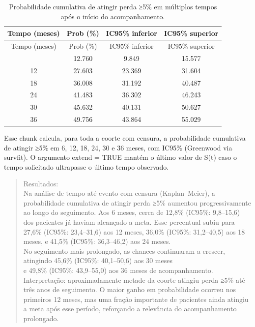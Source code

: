 \documentclass[
]{article}
\begin{document}
\begin{longtable}[]{@{}cccc@{}}
\caption{Probabilidade cumulativa de atingir perda ≥5\% em múltiplos
tempos após o início do acompanhamento.}\tabularnewline
\toprule\noalign{}
Tempo (meses) & Prob (\%) & IC95\% inferior & IC95\% superior \\
\midrule\noalign{}
\endfirsthead
\toprule\noalign{}
Tempo (meses) & Prob (\%) & IC95\% inferior & IC95\% superior \\
\midrule\noalign{}
\endhead
\bottomrule\noalign{}
\endlastfoot
6 & 12.760 & 9.849 & 15.577 \\
12 & 27.603 & 23.369 & 31.604 \\
18 & 36.008 & 31.192 & 40.487 \\
24 & 41.483 & 36.302 & 46.243 \\
30 & 45.632 & 40.131 & 50.627 \\
36 & 49.756 & 43.864 & 55.029 \\
\end{longtable}

Esse chunk calcula, para toda a coorte com censura, a probabilidade
cumulativa de atingir ≥5\% em 6, 12, 18, 24, 30 e 36 meses, com IC95\%
(Greenwood via survfit). O argumento extend = TRUE mantém o último valor
de S(t) caso o tempo solicitado ultrapasse o último tempo observado.

\begin{quote}
Resultados:\\
Na análise de tempo até evento com censura (Kaplan--Meier), a
probabilidade cumulativa de atingir perda ≥5\% aumentou progressivamente
ao longo do seguimento. Aos 6 meses, cerca de 12,8\% (IC95\%: 9,8--15,6)
dos pacientes já haviam alcançado a meta. Esse percentual subiu para
27,6\% (IC95\%: 23,4--31,6) aos 12 meses, 36,0\% (IC95\%: 31,2--40,5)
aos 18 meses, e 41,5\% (IC95\%: 36,3--46,2) aos 24 meses.\\
No seguimento mais prolongado, as chances continuaram a crescer,
atingindo 45,6\% (IC95\%: 40,1--50,6) aos 30 meses\\
e 49,8\% (IC95\%: 43,9--55,0) aos 36 meses de acompanhamento.\\
Interpretação: aproximadamente metade da coorte atingiu perda ≥5\% até
três anos de seguimento. O maior ganho em probabilidade ocorreu nos
primeiros 12 meses, mas uma fração importante de pacientes ainda atingiu
a meta após esse período, reforçando a relevância do acompanhamento
prolongado.\\
\end{quote}
\end{document}
